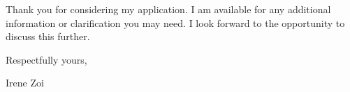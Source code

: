 {\begin{flushleft}


Thank you for considering my application. I am available for any additional information or clarification you may need. I look forward to the opportunity to discuss this further.

Respectfully yours,

Irene Zoi
\end{flushleft}

}